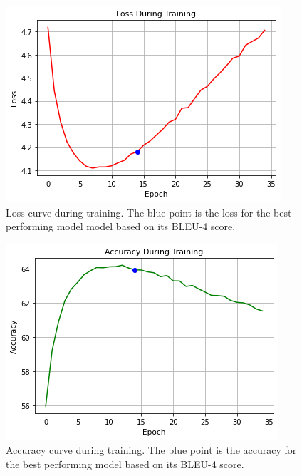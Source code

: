 \documentclass[11pt,a4paper]{article}
\begin{document}
\begin{figure}[h]
  \includegraphics[width=\linewidth]{paper/images/loss_graph.png}
  \caption{Loss curve during training. The blue point is the loss for the best performing model model based on its BLEU-4 score.}
  \label{fig:lossgraph}
\end{figure}

\begin{figure}[h]
  \includegraphics[width=\linewidth]{paper/images/accuracy_graph.png}
  \caption{Accuracy curve during training. The blue point is the accuracy for the best performing model based on its BLEU-4 score.}
  \label{fig:accuracygraph}
\end{figure}
\end{document}
